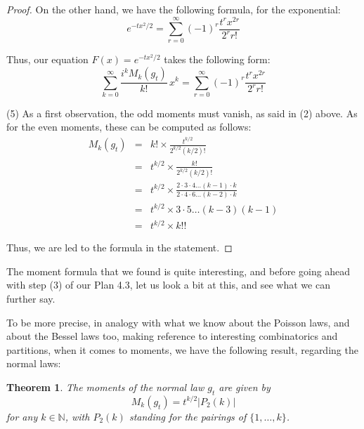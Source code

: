 \documentclass[12pt]{amsbook}
\newtheorem{theorem}{Theorem}[chapter]
\begin{document}
\begin{proof}
On the other hand, we have the following formula, for the exponential:
$$e^{-tx^2/2}
=\sum_{r=0}^\infty
(-1)^r\frac{t^rx^{2r}}{2^rr!}$$

Thus, our equation $F(x)=e^{-tx^2/2}$ takes the following form:
$$\sum_{k=0}^\infty\frac{i^kM_k(g_t)}{k!}\,x^k=\sum_{r=0}^\infty
(-1)^r\frac{t^rx^{2r}}{2^rr!}$$

(5) As a first observation, the odd moments must vanish, as said in (2) above. As for the even moments, these can be computed as follows:
\begin{eqnarray*}
M_k(g_t)
&=&k!\times\frac{t^{k/2}}{2^{k/2}(k/2)!}\\
&=&t^{k/2}\times\frac{k!}{2^{k/2}(k/2)!}\\
&=&t^{k/2}\times\frac{2\cdot3\cdot4\ldots (k-1)\cdot k}{2\cdot 4\cdot 6\ldots (k-2)\cdot k}\\
&=&t^{k/2}\times 3\cdot 5\ldots(k-3)(k-1)\\
&=&t^{k/2}\times k!!
\end{eqnarray*}

Thus, we are led to the formula in the statement.
\end{proof}

The moment formula that we found is quite interesting, and before going ahead with step (3) of our Plan 4.3, let us look a bit at this, and see what we can further say. 

\bigskip

To be more precise, in analogy with what we know about the Poisson laws, and about the Bessel laws too, making reference to interesting combinatorics and partitions, when it comes to moments, we have the following result, regarding the normal laws:

\begin{theorem}
The moments of the normal law $g_t$ are given by
$$M_k(g_t)=t^{k/2}|P_2(k)|$$
for any $k\in\mathbb N$, with $P_2(k)$ standing for the pairings of $\{1,\ldots,k\}$.
\end{theorem}
\end{document}
